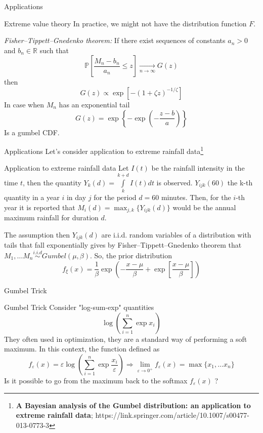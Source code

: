 \documentclass{beamer}
\begin{document}
\begin{frame}{Applications}
    \begin{block}{Extreme value theory}
        In practice, we might not have the distribution function $F$. 

        \textit{Fisher–Tippett–Gnedenko theorem:}  If there exist sequences of constants $a_{n}>0$ and $b_n \in \mathbb{R}$ such that
        \[\mathbb{P}\left[\dfrac{M_n - b_n}{a_n}\leq z\right] \underset{n\to\infty}{\longrightarrow} G(z)\]
        then
        \[G(z) \propto \exp{\left[-(1 + \zeta z)^{-1/\zeta}\right]}\]
        In case when $M_n$ has an exponential tail
        \[G(z) = \exp\left\{-\exp{\left(-\dfrac{z - b}{a}\right)}\right\}\]
        Is a gumbel CDF. 
    \end{block}
\end{frame}

\begin{frame}{Applications}
    Let's consider application to extreme rainfall data\footnote{\textbf{A Bayesian analysis of the Gumbel distribution: an application to extreme rainfall data}; https://link.springer.com/article/10.1007/s00477-013-0773-3}
    \begin{block}{Application to extreme rainfall data}
        Let $I(t)$ be the rainfall intensity in the time $t$, then the quantity $Y_k(d) = \int\limits_{k}^{k+d}I(t)dt$ is observed. $Y_{ijk}(60)$ the k-th quantity in a year $i$ in day $j$ for the period $d = 60$ minutes. Then, for the $i$-th year it is reported that $M_i(d) = \max_{j, k}\{Y_{ijk}(d)\}$ would be the annual maximum rainfall for duration $d$.

        The assumption then $Y_{ijk}(d)$ are i.i.d. random variables of a distribution with tails that fall exponentially gives by Fisher–Tippett–Gnedenko theorem that $M_1, \ldots M_n \overset{i.i.d}{\sim} Gumbel(\mu, \beta)$. So, the prior distribution
        \[f_{\xi}(x) = \dfrac{1}{\beta}\exp{\left(-\dfrac{x - \mu}{\beta} + \exp{\left[\dfrac{x - \mu}{\beta}\right]}\right)}\]
    \end{block}
\end{frame}

\begin{frame}{Gumbel Trick}
    \begin{block}{Gumbel Trick}
        Consider "log-sum-exp" quantities
        \[\log\left(\sum_{i=1}^n\exp{x_i}\right)\]
        They often used in optimization, they are a standard way of performing a soft maximum. In this context, the function defined as
        \[f_{\varepsilon}(x) = \varepsilon \log\left(\sum_{i=1}^n\exp{\frac{x_i}{\varepsilon}}\right) \Rightarrow \lim\limits_{\varepsilon\to 0^+}f_\varepsilon (x) = \max\{x_1, \ldots x_n\}\]
        Is it possible to go from the maximum back to the softmax $f_\varepsilon (x)$ ?
    \end{block}
\end{frame}
\end{document}
